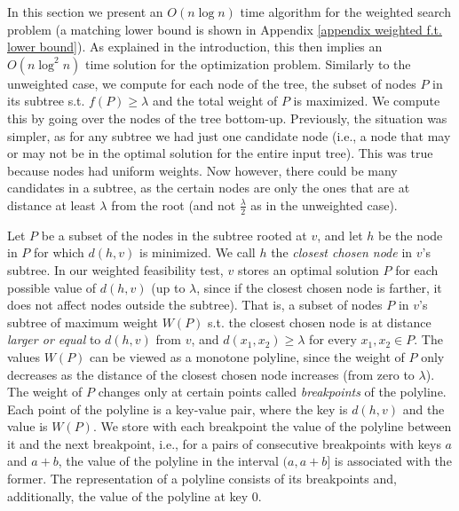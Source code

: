 \documentclass[a4paper,UKenglish]{lipics-v2016}
\theoremstyle{plain}
\begin{document}
In this section we present an $O(n\log n)$ time algorithm for the weighted search problem (a matching lower bound is shown in Appendix \ref{appendix weighted f.t. lower bound}).
As explained in the introduction, this then implies an $O(n\log^{2}n)$ time solution for the optimization problem.
%
Similarly to the unweighted case, we compute for each node of the tree, the subset of nodes $P$ in its subtree  s.t. $f(P) \geq \lambda$ and the total  weight of  $P$ is maximized. We compute this by going over the nodes of the tree bottom-up. Previously, the situation was simpler, as for any subtree we had just one candidate node (i.e., a node that may or may not be in the optimal solution for the entire input tree). This was true because nodes had uniform weights. Now however, there could be many candidates in a subtree, as the certain nodes are only the ones that are at distance at least $\lambda$ from the root (and not $\frac{\lambda}{2}$ as in the unweighted case).

Let $P$ be a subset of the nodes in the subtree rooted at $v$, and let $h$ be the node in $P$ for which $d(h,v)$ is minimized. We call $h$ the {\em closest chosen node} in $v$'s subtree. In our weighted feasibility test, $v$ stores an optimal solution $P$ for each possible value of $d(h,v)$ (up to $\lambda$, since if the closest chosen node is farther, it does not affect nodes outside the subtree). That is, a subset of nodes $P$ in $v$'s subtree of maximum weight $W(P)$ s.t. the closest chosen node is at distance {\em larger or equal} to $d(h,v)$ from $v$, and $d(x_1,x_2) \geq \lambda$ for every  $x_1,x_2\in P$. 
The values $W(P)$ can be viewed as a monotone polyline, since the weight of $P$ only decreases as the distance of the closest chosen node increases (from zero to $\lambda$). The weight of $P$ changes only at certain points called {\em breakpoints} of the polyline. Each point of the polyline is a key-value pair, where the key is $d(h,v)$ and the value is $W(P)$. We store with each breakpoint the value of the polyline between it and the next breakpoint,
i.e., for a pairs of consecutive breakpoints with keys $a$ and $a+b$, the value of the polyline in the interval $(a,a+b]$ is associated with the former.
The representation of a polyline consists of its breakpoints and, additionally, the value of the polyline at key 0.

\end{document}
